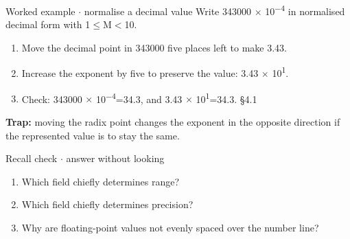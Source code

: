 \documentclass[11pt]{article}
\begin{document}
\begin{keepsection}
\begin{keepsection}
\begin{workedbox}{Worked example \ensuremath{\cdot} normalise a decimal value}
Write 343000 \ensuremath{\times} 10\textsuperscript{\ensuremath{-}4} in normalised decimal form with 1\ensuremath{\leq}M\ensuremath{<}10.

\begin{enumerate}
\item Move the decimal point in 343000 five places left to make 3.43.
\item Increase the exponent by five to preserve the value: 3.43 \ensuremath{\times} 10\textsuperscript{1}.
\item Check: 343000 \ensuremath{\times} 10\textsuperscript{\ensuremath{-}4}=34.3, and 3.43 \ensuremath{\times} 10\textsuperscript{1}=34.3. \hfill{\small\color{FAUblue}§4.1}
\end{enumerate}
\end{workedbox}

\begin{notebox}\textbf{Trap:} moving the radix point changes the exponent in the opposite direction if the represented value is to stay the same.\end{notebox}

\begin{recallbox}{Recall check \ensuremath{\cdot} answer without looking}
\begin{enumerate}
\item Which field chiefly determines range?
\item Which field chiefly determines precision?
\item Why are floating-point values not evenly spaced over the number line?
\end{enumerate}

\end{recallbox}
\end{keepsection}
\end{keepsection}
\end{document}
